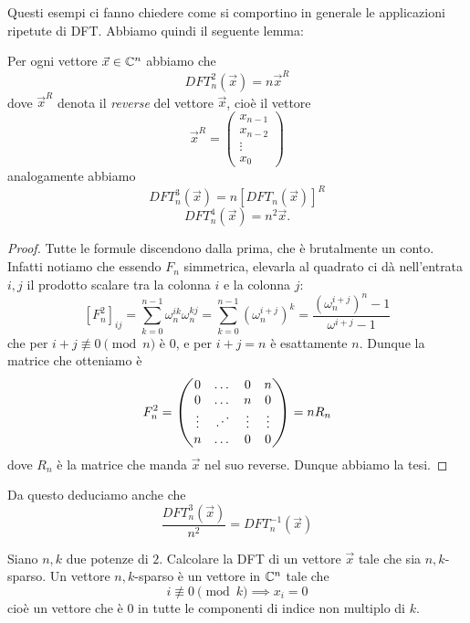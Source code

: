 \documentclass[11pt]{scrartcl}
\begin{document}
	Questi esempi ci fanno chiedere come si comportino in generale le applicazioni ripetute di DFT. Abbiamo quindi il seguente lemma:
	\begin{lemma}
		Per ogni vettore $\vec{x}\in\mathbb C^n$ abbiamo che 
		$$DFT_n^2(\vec{x})=n\vec{x}^R$$
		dove $\vec{x}^R$ denota il \textit{reverse} del vettore $\vec{x}$, cioè il vettore
		$$\vec{x}^R=
		\begin{pmatrix}
			x_{n-1} \\
			x_{n-2} \\
			\vdots \\
			x_0
		\end{pmatrix}
		$$
		analogamente abbiamo
		$$DFT^3_n(\vec{x})=n\left[DFT_n(\vec{x})\right]^R$$
		$$DFT^4_n(\vec{x})=n^2\vec{x}.$$
	\end{lemma}
	\begin{proof}
		Tutte le formule discendono dalla prima, che è brutalmente un conto. Infatti notiamo che essendo $F_n$ simmetrica, elevarla al quadrato ci dà nell'entrata $i,j$ il prodotto scalare tra la colonna $i$ e la colonna $j$:
		$$\left[F_n^2\right]_{ij}=\sum_{k=0}^{n-1}\omega_n^{ik}\omega_n^{kj}=\sum_{k=0}^{n-1}\left(\omega_n^{i+j}\right)^k=\frac{\left(\omega_n^{i+j}\right)^n-1}{\omega^{i+j}-1}$$
		che per $i+j\not\equiv 0 \pmod n$ è $0$, e per $i+j=n$ è esattamente $n$. Dunque la matrice che otteniamo è
		$$F_n^2=
		\begin{pmatrix}
			0 & \dots & 0 & n \\
			0 & \dots & n & 0 \\
			\vdots & \reflectbox{$\ddots$} & \vdots & \vdots \\
			n & \dots & 0 & 0
		\end{pmatrix}
		=
		nR_n
		$$ 
		dove $R_n$ è la matrice che manda $\vec{x}$ nel suo reverse. Dunque abbiamo la tesi.
	\end{proof}
	Da questo deduciamo anche che
	$$\frac{DFT_n^3(\vec{x})}{n^2}=DFT^{-1}_n(\vec{x})$$
	\begin{example}
		Siano $n,k$ due potenze di $2$. Calcolare la DFT di un vettore $\vec{x}$ tale che sia $n,k$-sparso. Un vettore $n,k$-sparso è un vettore in $\mathbb C^n$ tale che 
		$$i\not\equiv 0 \pmod k \implies x_i=0$$
		cioè un vettore che è $0$ in tutte le componenti di indice non multiplo di $k$.
	\end{example}
\end{document}
